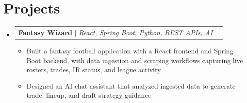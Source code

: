 \documentclass[letterpaper,11pt]{article}
\makeatletter
\newcommand{\resumeItem}[1]{
  \item\small{
    {#1 \vspace{-1pt}}
  }
}
\newcommand{\resumeProjectHeading}[2]{
    \item
    \begin{tabular*}{0.97\textwidth}{l@{\extracolsep{\fill}}r}
      \small#1 & #2 \\
    \end{tabular*}\vspace{-7pt}
}
\newcommand{\resumeSubHeadingListStart}{\begin{itemize}[leftmargin=0.15in, label={}]}
\newcommand{\resumeSubHeadingListEnd}{\end{itemize}}
\newcommand{\resumeItemListStart}{\begin{itemize}[leftmargin=0.18in,itemsep=1pt,topsep=2pt]}
\newcommand{\resumeItemListEnd}{\end{itemize}\vspace{-5pt}}
\makeatother
\begin{document}
%
\section{Projects}
    \resumeSubHeadingListStart
      \resumeProjectHeading
          {\textbf{Fantasy Wizard} $|$ \emph{React, Spring Boot, Python, REST APIs, AI}}{}
          \resumeItemListStart
            \resumeItem{Built a fantasy football application with a React frontend and Spring Boot backend, with data ingestion and scraping workflows capturing live rosters, trades, IR status, and league activity}
            \resumeItem{Designed an AI chat assistant that analyzed ingested data to generate trade, lineup, and draft strategy guidance}
          \resumeItemListEnd
    \resumeSubHeadingListEnd

\end{document}
